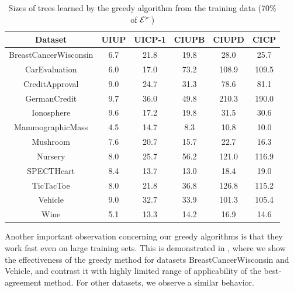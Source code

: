 \begin{table}
  \centering
  \small
	\setlength\tabcolsep{6pt}
  \begin{tabular}{ |c||c|c|c|c|c| }
    \hline
    Dataset          & UIUP & UICP-1 & CIUPB & CIUPD  & CICP \\
    \hline \hline                                       
    BreastCancerWisconsin              & 6.7  & 21.8   & 19.8  & 28.0   & 25.7    \\ \hline
    CarEvaluation               & 6.0  & 17.0   & 73.2  & 108.9  & 109.5   \\ \hline
    CreditApproval               & 9.0  & 24.7   & 31.3  & 78.6   & 81.1    \\ \hline
    GermanCredit               & 9.7  & 36.0   & 49.8  & 210.3  & 190.0   \\ \hline
    Ionosphere               & 9.6  & 17.2   & 19.8  & 31.5   & 30.6    \\ \hline
    MammographicMass               & 4.5  & 14.7   & 8.3   & 10.8   & 10.0    \\ \hline
    Mushroom               & 7.6  & 20.7   & 15.7  & 22.7   & 16.3    \\ \hline
    Nursery               & 8.0  & 25.7   & 56.2  & 121.0  & 116.9   \\ \hline
    SPECTHeart               & 8.4  & 13.7   & 13.0  & 18.4   & 19.0    \\ \hline
    TicTacToe              & 8.0  & 21.8   & 36.8  & 126.8  & 115.2   \\ \hline
    Vehicle               & 9.0  & 32.7   & 33.9  & 101.3  & 105.4   \\ \hline
    Wine               & 5.1  & 13.3   & 14.2  & 16.9   & 14.6    \\ \hline
  \end{tabular}
  \caption{Sizes of trees learned by the greedy algorithm from the training 
					 data (70\% of $\mathcal{E}^\succ$)}
  \label{tbl:trees_size}
\end{table}

Another important observation concerning our greedy algorithms is that
they work fast even on large training sets. This is demonstrated in 
, where we show the effectiveness of the greedy method
for datasets BreastCancerWisconsin and Vehicle, and contrast it with highly limited range of
applicability of the best-agreement method. For other datasets, we observe 
a similar behavior.

